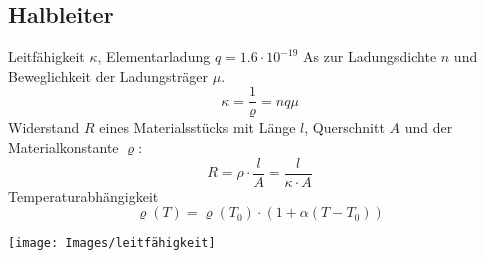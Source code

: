 \subsection{Halbleiter}
Leitfähigkeit $\kappa$, Elementarladung $q = 1.6\cdot10^{-19}$ As zur Ladungsdichte $n$ und Beweglichkeit der Ladungsträger $\mu$.
\[
\kappa = \frac{1}{\varrho} = nq\mu
\]
Widerstand $R$ eines Materialsstücks mit Länge $l$, Querschnitt $A$ und der Materialkonstante $\varrho$:
\[
R = \rho \cdot \frac{l}{A} = \frac{l}{\kappa \cdot A}
\]
Temperaturabhängigkeit
\[
\varrho(T) = \varrho(T_0) \cdot (1 + \alpha(T - T_0))
\]

\texttt{[image: Images/leitfähigkeit]}


